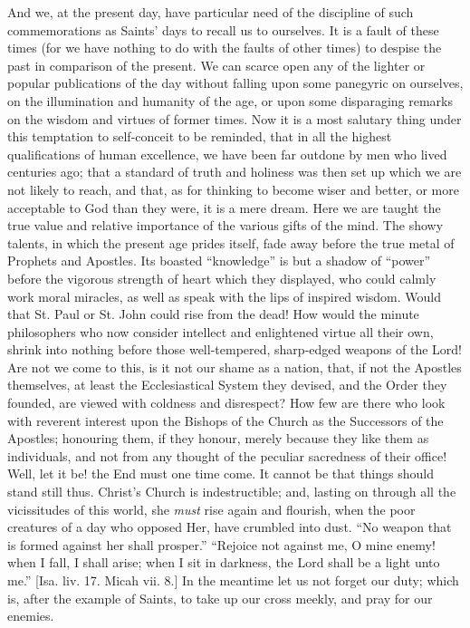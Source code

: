 And we, at the present day, have particular need of the discipline of
such commemorations as Saints' days to recall us to ourselves. It is a
fault of these times (for we have nothing to do with the faults of other
times) to despise the past in comparison of the present. We can scarce
open any of the lighter or popular publications of the day without
falling upon some panegyric on ourselves, on the illumination and
humanity of the age, or upon some disparaging remarks on the wisdom and
virtues of former times. Now it is a most salutary thing under this
temptation to self-conceit to be reminded, that in all the highest
qualifications of human excellence, we have been far outdone by men who
lived centuries ago; that a standard of truth and holiness was then set
up which we are not likely to reach, and that, as for thinking to become
wiser and better, or more acceptable to God than they were, it is a mere
dream. Here we are taught the true value and relative importance of the
various gifts of the mind. The showy talents, in which the present age
prides itself, fade away before the true metal of Prophets and Apostles.
Its boasted ``knowledge'' is but a shadow of ``power''
before the vigorous strength of heart which they displayed, who could
calmly work moral miracles, as well as speak with the lips of inspired
wisdom. Would that St. Paul or St. John could rise from the dead! How
would the minute philosophers who now consider intellect and enlightened
virtue all their own, shrink into nothing before those well-tempered,
sharp-edged weapons of the Lord! Are not we come to this, is it not our
shame as a nation, that, if not the Apostles themselves, at least the
Ecclesiastical System they devised, and the Order they founded, are
viewed with coldness and disrespect? How few are there who look with
reverent interest upon the Bishops of the Church as the Successors of
the Apostles; honouring them, if they honour, merely because they like
them as individuals, and not from any thought of the peculiar sacredness
of their office! Well, let it be! the End must one time come. It cannot
be that things should stand still thus. Christ's Church is
indestructible; and, lasting on through all the vicissitudes of this
world, she \emph{must} rise again and flourish, when the poor creatures of a
day who opposed Her, have crumbled into dust. ``No weapon that is
formed against her shall prosper.'' ``Rejoice not against me, O
mine enemy! when I fall, I shall arise; when I sit in darkness, the Lord
shall be a light unto me.'' [Isa. liv. 17. Micah vii. 8.] In the
meantime let us not forget our duty; which is, after the example of
Saints, to take up our cross meekly, and pray for our enemies.


